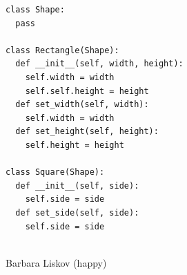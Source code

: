 \documentclass[calcdimensions,landscape,letterpaper]{powersem}
\newcommand{\thecurrentheading}{}
\newcommand{\heading}[1]{\renewcommand{\thecurrentheading}{#1}}
\begin{document}
\begin{slide}
  \heading{Liskov-Substitution - After}
  \begin{center}
    \begin{minipage}[b]{.6\textwidth}
      \begin{verbatim}
class Shape:
  pass

class Rectangle(Shape):
  def __init__(self, width, height):
    self.width = width
    self.self.height = height
  def set_width(self, width):
    self.width = width
  def set_height(self, height):
    self.height = height

class Square(Shape):
  def __init__(self, side):
    self.side = side
  def set_side(self, side):
    self.side = side
      \end{verbatim}
    \end{minipage}
    \begin{minipage}[b]{.35\textwidth}
      \begin{center}
        \\
        Barbara Liskov (happy)
      \end{center}
    \end{minipage}
  \end{center}
\end{slide}
\end{document}

